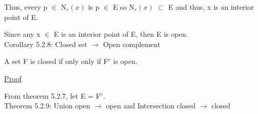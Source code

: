 	Thus, every p $\in$ N$_r(x)$ is p $\in$ E so N$_r(x)$ $\subset$ E and thus,
	x is an interior point of E.

	Since any x $\in$ E is an interior point of E, then E is open. \\

{ \color{orange} Corollary 5.2.8: Closed set $\rightarrow$ Open complement } 

	\begin{adjustbox}{minipage=14cm, right, vspace=0.1cm 0cm}
		A set F is closed if only only if F$^\text{c}$ is open.
	\end{adjustbox}

{ \color{magenta} \underline{Proof} } 

	From {\color{red} theorem 5.2.7}, let E = F$^\text{c}$. \\

{ \color{red} Theorem 5.2.9: Union open $\rightarrow$ open and
Intersection closed $\rightarrow$ closed } 

